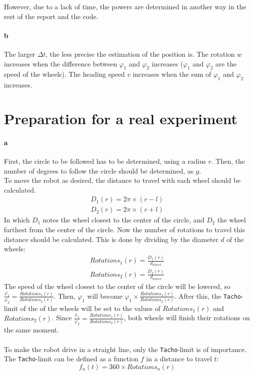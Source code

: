 \documentclass[12pt]{article}
\begin{document}
However, due to a lack of time, the powers are determined in another way in the rest of the report and the code.

\paragraph{b} The larger ${\Delta}t$, the less precise the estimation of the position is. The rotation $w$ increases when the difference between $\varphi_1$ and $\varphi_2$ increases ($\varphi_1$ and $\varphi_2$ are the speed of the wheels). The heading speed $v$ increases when the sum of $\varphi_1$ and $\varphi_2$ increases.
\section{Preparation for a real experiment}
\paragraph{a} First, the circle to be followed has to be determined, using a radius $r$. Then, the number of degrees to follow the circle should be determined, as $g$. \\ 
To move the robot as desired, the distance to travel with each wheel should be calculated. 
\begin{equation}
\begin{split}
    D_1(r) = 2\pi \times (r - l) \\
    D_2(r) = 2\pi \times (r + l)
\end{split}
\end{equation}
In which $D_1$ notes the wheel closest to the center of the circle, and $D_2$ the wheel farthest from the center of the circle. Now the number of rotations to travel this distance should be calculated. This is done by dividing by the diameter $d$ of the wheels:
\begin{equation}
\begin{split}
    Rotations_1(r) = \frac{D_1(r)}{d_{wheel}} \\
    Rotations_2(r) = \frac{D_2(r)}{d_{wheel}}
\end{split}
\end{equation}
The speed of the wheel closest to the center of the circle will be lowered, so $\frac{\varphi_1}{\varphi_2} = \frac{Rotations_1(r)}{Rotations_2(r)}$. Then, $\varphi_1$ will become $\varphi_1 \times \frac{Rotations_1(r)}{Rotations_2(r)}$. After this, the \verb|Tacho|-limit of the of the wheels will be set to the values of $Rotations_1(r)$ and $Rotations_2(r)$. Since $\frac{\varphi_1}{\varphi_2} = \frac{Rotations_1(r)}{Rotations_2(r)}$, both wheels will finish their rotations on the same moment. \\ \\
To make the robot drive in a straight line, only the \verb|Tacho|-limit is of importance. The \verb|Tacho|-limit can be defined as a function $f$ in a distance to travel $t$:
\begin{equation}
    f_n(t) = 360 \times Rotations_n(r)
\end{equation}
\end{document}
